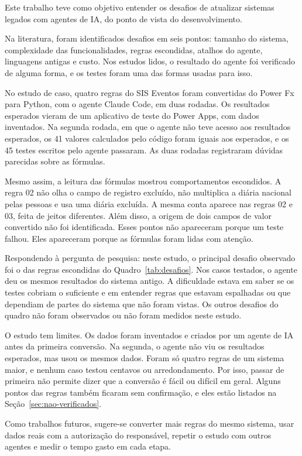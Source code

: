 Este trabalho teve como objetivo entender os desafios de atualizar sistemas legados com agentes de IA, do ponto de vista do desenvolvimento.

Na literatura, foram identificados desafios em seis pontos: tamanho do sistema, complexidade das funcionalidades, regras escondidas, atalhos do agente, linguagens antigas e custo. Nos estudos lidos, o resultado do agente foi verificado de alguma forma, e os testes foram uma das formas usadas para isso.

No estudo de caso, quatro regras do SIS Eventos foram convertidas do Power Fx para Python, com o agente Claude Code, em duas rodadas. Os resultados esperados vieram de um aplicativo de teste do Power Apps, com dados inventados. Na segunda rodada, em que o agente não teve acesso aos resultados esperados, os 41 valores calculados pelo código foram iguais aos esperados, e os 45 testes escritos pelo agente passaram. As duas rodadas registraram dúvidas parecidas sobre as fórmulas.

Mesmo assim, a leitura das fórmulas mostrou comportamentos escondidos. A regra 02 não olha o campo de registro excluído, não multiplica a diária nacional pelas pessoas e usa uma diária excluída. A mesma conta aparece nas regras 02 e 03, feita de jeitos diferentes. Além disso, a origem de dois campos de valor convertido não foi identificada. Esses pontos não apareceram porque um teste falhou. Eles apareceram porque as fórmulas foram lidas com atenção.

Respondendo à pergunta de pesquisa: neste estudo, o principal desafio observado foi o das regras escondidas do Quadro~\ref{tab:desafios}. Nos casos testados, o agente deu os mesmos resultados do sistema antigo. A dificuldade estava em saber se os testes cobriam o suficiente e em entender regras que estavam espalhadas ou que dependiam de partes do sistema que não foram vistas. Os outros desafios do quadro não foram observados ou não foram medidos neste estudo.

O estudo tem limites. Os dados foram inventados e criados por um agente de IA antes da primeira conversão. Na segunda, o agente não viu os resultados esperados, mas usou os mesmos dados. Foram só quatro regras de um sistema maior, e nenhum caso testou centavos ou arredondamento. Por isso, passar de primeira não permite dizer que a conversão é fácil ou difícil em geral. Alguns pontos das regras também ficaram sem confirmação, e eles estão listados na Seção~\ref{sec:nao-verificados}.

Como trabalhos futuros, sugere-se converter mais regras do mesmo sistema, usar dados reais com a autorização do responsável, repetir o estudo com outros agentes e medir o tempo gasto em cada etapa.
